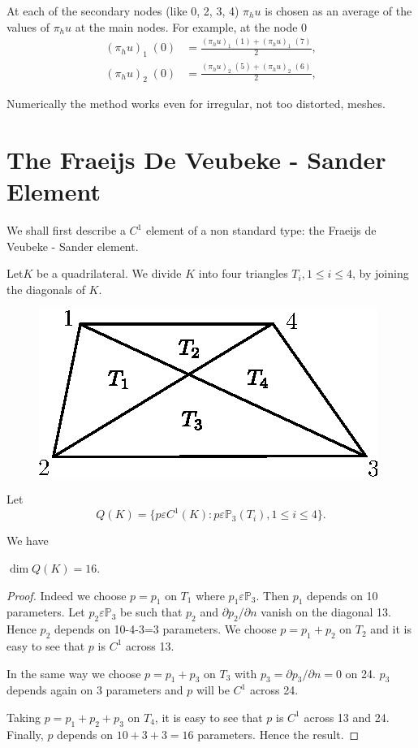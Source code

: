 \begin{exercise}
At each of the secondary nodes (like 0, 2, 3, 4) $\pi_hu$ is chosen as
an average of the values of $\pi_hu$ at the main nodes. For example,
at the node $0$
\begin{align*}
(\pi_hu)_1\;(0) &= \frac{(\pi_hu)_1\;(1)+(\pi_hu)_1\;(7)}{2},\\
(\pi_hu)_2\;(0) &= \frac{(\pi_hu)_2\;(5)+(\pi_hu)_2\;(6)}{2},
\end{align*}

Numerically the method works even for irregular, not too distorted, meshes.
\end{exercise}

\section{The Fraeijs De Veubeke - Sander Element} \label{chap6:ssec6.3}
 We shall first describe a $C^1$ element of a non standard type: the Fraeijs de  Veubeke - Sander element.

Let\pageoriginale $K$ be a quadrilateral. We divide $K$ into four
triangles $T_i, 1\leq i\leq 4$, by joining the diagonals of $K$.
\begin{figure}[H]
\centering
\includegraphics{figure/fig6.4.eps}
\caption{}\label{fig6.4}
\end{figure}

Let
$$
Q(K)=\{p\varepsilon C^1(K):p\varepsilon\mathbb{P}_3(T_i), 1\leq i\leq
4\}.
$$

We have 

\setcounter{lem}{0}
\begin{lem}\label{chap6:lem1}
$\dim Q(K)=16$.
\end{lem}
\begin{proof}
Indeed we choose $p=p_1$ on $T_1$ where
$p_1\varepsilon\mathbb{P}_3$. Then $p_1$ depends on 10 parameters. Let
$p_2 \varepsilon\mathbb{P}_3$ be such that $p_2$ and $\partial
p_2/\partial n$ vanish on the diagonal 13. Hence $p_2$ depends on
10-4-3=3 parameters. We choose $p=p_1+p_2$ on $T_2$ and it is easy to
see that $p$ is $C^1$ across 13.

In the same way we choose $p=p_1+p_3$ on $T_3$ with $p_3=\partial
p_3/\partial n=0$ on 24. $p_3$ depends again on 3 parameters and $p$
will be $C^1$ across 24.

Taking $p=p_1+p_2+p_3$ on $T_4$, it is easy to see that $p$ is $C^1$
across 13 and 24. Finally, $p$ depends on $10+3+3=16$
parameters. Hence the result.
\end{proof}

